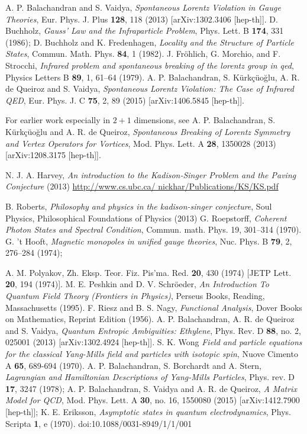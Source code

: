 \begin{thebibliography}{99}
 A. P. Balachandran and S. Vaidya, \textit{Spontaneous Lorentz Violation in Gauge Theories}, Eur. Phys. J. Plus \textbf{128}, 118 (2013) [arXiv:1302.3406 [hep-th]]. 
 D. Buchholz, \textit{Gauss' Law and the Infraparticle Problem}, Phys. Lett. B \textbf{174}, 331 (1986); D. Buchholz and K. Fredenhagen, \textit{Locality and the Structure of Particle States}, Commun. Math. Phys. \textbf{84}, 1 (1982). 
 J. Fr\"ohlich, G. Morchio, and F. Strocchi, \textit{Infrared problem and spontaneous breaking of the lorentz group in qed}, Physics Letters B \textbf{89}, 1, 61--64 (1979).
 A. P. Balachandran, S. K\"urk\c{c}\"uo\u{g}lu, A. R. de Queiroz and S. Vaidya, \textit{Spontaneous Lorentz Violation: The Case of Infrared QED}, Eur. Phys. J. C \textbf{75}, 2, 89 (2015) [arXiv:1406.5845 [hep-th]].

For earlier work especially in $2+1$ dimensions, see A. P. Balachandran, S. K\"urk\c{c}\"uo\u{g}lu and A. R. de Queiroz, \textit{Spontaneous Breaking of Lorentz Symmetry and Vertex Operators for Vortices}, Mod. Phys. Lett. A \textbf{28}, 1350028 (2013) [arXiv:1208.3175 [hep-th]].

 N. J. A. Harvey, \textit{An introduction to the Kadison-Singer Problem and the Paving Conjecture} (2013) \url{http://www.cs.ubc.ca/ nickhar/Publications/KS/KS.pdf} 

B. Roberts, \textit{Philosophy and physics in the kadison-singer conjecture}, Soul Physics, Philosophical Foundations of Physics (2013)
 G. Roepstorff, \textit{Coherent Photon States and Spectral Condition}, Commun. math. Phys. 19, 301--314 (1970).
 G. 't Hooft, \textit{Magnetic monopoles in unified gauge theories}, Nuc. Phys. B \textbf{79}, 2, 276--284 (1974);

A. M. Polyakov, Zh. Eksp. Teor. Fiz. Pis'ma. Red. \textbf{20}, 430 (1974) [JETP Lett. \textbf{20}, 194 (1974)].
 M. E. Peshkin and D. V. Schr\"oeder, \textit{An Introduction To Quantum Field Theory (Frontiers in Physics)}, Perseus Books, Reading, Massachusetts (1995).
 F. Riesz and B. S. Nagy, \textit{Functional Analysis}, Dover Books on Mathematics, Reprint Edition (1956).
 A. P. Balachandran, A. R. de Queiroz and S. Vaidya, \textit{Quantum Entropic Ambiguities: Ethylene}, Phys. Rev. D \textbf{88}, no. 2, 025001 (2013) [arXiv:1302.4924 [hep-th]].
 S. K. Wong \textit{Field and particle equations for the classical Yang-Mills field and particles with isotopic spin}, Nuove Cimento A \textbf{65}, 689-694 (1970).
 A. P. Balachandran, S. Borchardt and A. Stern, \textit{Lagrangian and Hamiltonian Descriptions of Yang-Mills Particles}, Phys. rev. D \textbf{17}, 3247 (1978);
 A. P. Balachandran, S. Vaidya and A. R. de Queiroz, \textit{A Matrix Model for QCD}, Mod. Phys. Lett. A \textbf{30}, no. 16, 1550080 (2015) [arXiv:1412.7900 [hep-th]];
 K. E. Eriksson, \textit{Asymptotic states in quantum electrodynamics}, Phys. Scripta \textbf{1}, e (1970). doi:10.1088/0031-8949/1/1/001
\end{thebibliography}


